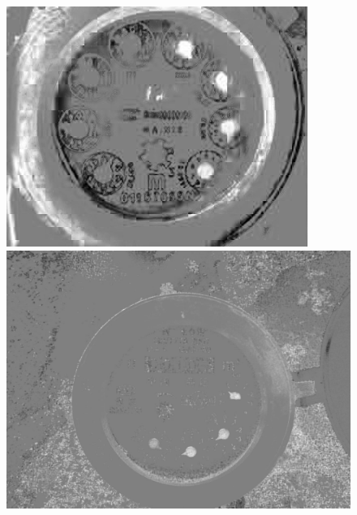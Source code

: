 \documentclass[a4paper]{ctexart}
\begin{document}
\begin{figure}[htbp]
	\centering
	\begin{minipage}[t]{0.25\textwidth}
		\centering
		\includegraphics[width=\textwidth]{figure/R_channel/img1.jpg}
	\end{minipage}
	\begin{minipage}[t]{0.25\textwidth}
		\centering
		\includegraphics[width=\textwidth]{figure/R_channel/img2.jpg}
	\end{minipage}\\
	\begin{minipage}[t]{0.25\textwidth}
		\centering

\end{minipage}
\end{figure}
\end{document}
